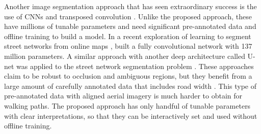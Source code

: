 Another image segmentation approach that has seen extraordinary success is the use of \ac{CNNs} and transposed convolution \cite{Badrinarayanan2017-il, Noh2015-ni, Shelhamer2017-rf, Ronneberger2015-sv}. Unlike the proposed approach, these have millions of tunable parameters and need significant pre-annotated data and offline training to build a model. In a recent exploration of learning to segment street networks from online maps \cite{Kaiser2017-np}, built a fully convolutional network with 137 million parameters. A similar approach with another deep architecture called U-net\cite{Ronneberger2015-sv} was applied to the street network segmentation problem \cite{Zhang2017-gi}. These approaches claim to be robust to occlusion and ambiguous regions, but they benefit from a large amount of carefully annotated data that includes road width \cite{Mnih2013-dp}. This type of pre-annotated data with aligned aerial imagery is much harder to obtain for walking paths. The proposed approach has only handful of tunable parameters with clear interpretations, so that they can be interactively set and used without offline training.

